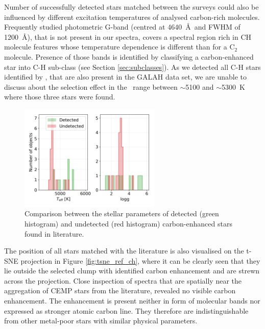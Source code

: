 Number of successfully detected stars matched between the surveys could also be influenced by different excitation temperatures of analysed carbon-rich molecules. Frequently studied photometric G-band (centred at 4640~\AA\ and FWHM of 1200~\AA), that is not present in our spectra, covers a spectral region rich in CH molecule features whose temperature dependence is different than for a C$_2$ molecule. Presence of those bands is identified by classifying a carbon-enhanced star into C-H sub-class (see Section \ref{sec:subclasses}). As we detected all C-H stars identified by \citet{2016ApJS..226....1J}, that are also present in the GALAH data set, we are unable to discuss about the selection effect in the \Teff\ range between $\sim$5100 and $\sim$5300~K where those three stars were found.

\begin{figure}
	\centering
	\includegraphics[width=0.6\textwidth]{ch_comb.png}
	\caption{Comparison between the stellar parameters of detected (green histogram) and undetected (red histogram) carbon-enhanced stars found in literature.}
	\label{fig:ch_xmatch}
\end{figure}

The position of all stars matched with the literature is also visualised on the \mbox{t-SNE} projection in Figure \ref{fig:tsne_ref_ch}, where it can be clearly seen that they lie outside the selected clump with identified carbon enhancement and are strewn across the projection. Close inspection of spectra that are spatially near the aggregation of CEMP stars from the literature, revealed no visible carbon enhancement. The enhancement is present neither in form of molecular bands nor expressed as stronger atomic carbon line. They therefore are indistinguishable from other metal-poor stars with similar physical parameters.

